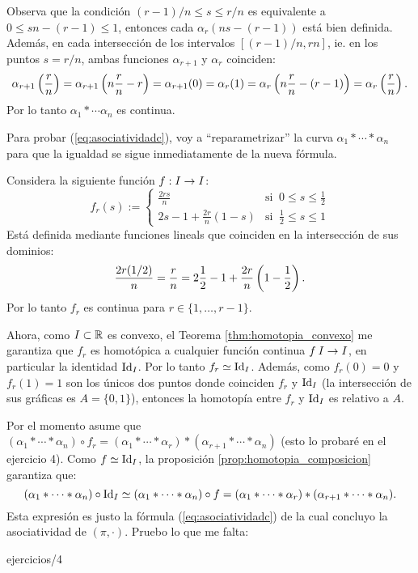 \documentclass[../../topologia_algebraica]{subfiles}
\begin{document}
Observa que la condici\'on $(r-1)/n\leq s \leq r/n$ es equivalente a $0\leq sn-(r-1) \leq 1$,
entonces cada $\alpha_r(ns-(r-1))$ est\'a bien definida. Adem\'as, en cada intersecci\'on de
los intervalos $[(r-1)/n,rn]$, ie. en los puntos $s=r/n$, ambas funciones $\alpha_{r+1}$ y
$\alpha_r$ coinciden:
\[
  \alpha_{r+1}\left( \frac{r}{n} \right)=\alpha_{r+1}\left( n\frac{r}{n}-r \right)=\alpha_{r+1}(0)=
  \alpha_{r}(1)=\alpha_{r}\left( n\frac{r}{n}-(r-1) \right)=\alpha_{r}\left( \frac{r}{n} \right).
\]
Por lo tanto $\alpha_1*\cdots\alpha_n$ es continua.

Para probar (\ref{eq:asociatividadc}), voy a ``reparametrizar'' la curva $\alpha_1*\cdots*\alpha_n$
para que la igualdad se sigue inmediatamente de la nueva f\'ormula.

Considera la siguiente funci\'on $f:I\rightarrow I$:
\begin{equation}\label{eq:fr}
  f_r(s):=
  \begin{cases}
    \frac{2rs}{n} & \text{si}\;\; 0\leq s\leq \frac{1}{2} \\
    2s-1+\frac{2r}{n}(1-s) & \text{si}\;\; \frac{1}{2}\leq s \leq 1
  \end{cases}
\end{equation}
Est\'a definida mediante funciones lineals que coinciden en la intersecci\'on de sus dominios:
\[
  \frac{2r(1/2)}{n}=\frac{r}{n}=2\frac{1}{2}-1+\frac{2r}{n}\left( 1-\frac{1}{2} \right).
\]
Por lo tanto $f_r$ es continua para $r\in\{1,\ldots,r-1\}$.

Ahora, como $I\subset \mathbb{R}$ es convexo,
el Teorema \ref{thm:homotopia_convexo} me garantiza que $f_r$ es homot\'opica a cualquier funci\'on
continua $f\:I\rightarrow I$, en particular la identidad $\text{Id}_I$. Por lo tanto $f_r\simeq \text{Id}_I$. Adem\'as,
como $f_r(0)=0$ y $f_r(1)=1$ son los \'unicos dos puntos donde coinciden $f_r$ y $\text{Id}_I$ (la
intersecci\'on de sus gr\'aficas es $A=\{0,1\}$), entonces la homotop\'ia entre $f_r$ y $\text{Id}_I$ es
relativo a $A$.

Por el momento asume que $(\alpha_1*\cdots*\alpha_n)\circ f_r=
(\alpha_1*\cdots*\alpha_r)*(\alpha_{r+1}*\cdots*\alpha_n)$ (esto lo probar\'e en el ejercicio 4).
Como $f\simeq\text{Id}_I$, la proposici\'on \ref{prop:homotopia_composicion} garantiza que:
\[
  (\alpha_1*\cdots*\alpha_n) \circ \text{Id}_I \simeq (\alpha_1*\cdots*\alpha_n)\circ f =
  (\alpha_1*\cdots*\alpha_r)*(\alpha_{r+1}*\cdots*\alpha_n).
\]
Esta expresi\'on es justo la f\'ormula (\ref{eq:asociatividadc}) de la cual concluyo la
asociatividad de $(\pi,\cdot)$. Pruebo lo que me falta:

{ejercicios/4}  %
\end{document}
